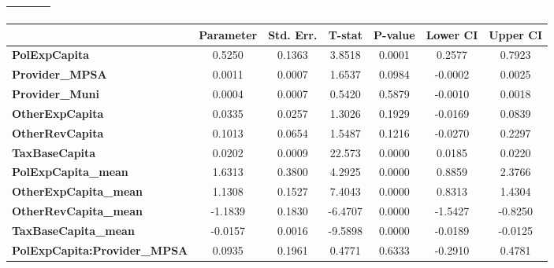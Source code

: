 \begin{center}
\begin{tabular}{lclc}
\textbf{}                                  &                    & \textbf{                     }   &                  \\
\bottomrule
\end{tabular}
\begin{tabular}{lcccccc}
                                           & \textbf{Parameter} & \textbf{Std. Err.} & \textbf{T-stat} & \textbf{P-value} & \textbf{Lower CI} & \textbf{Upper CI}  \\
\midrule
\textbf{PolExpCapita}                      &       0.5250       &       0.1363       &      3.8518     &      0.0001      &       0.2577      &       0.7923       \\
\textbf{Provider\_MPSA}                    &       0.0011       &       0.0007       &      1.6537     &      0.0984      &      -0.0002      &       0.0025       \\
\textbf{Provider\_Muni}                    &       0.0004       &       0.0007       &      0.5420     &      0.5879      &      -0.0010      &       0.0018       \\
\textbf{OtherExpCapita}                    &       0.0335       &       0.0257       &      1.3026     &      0.1929      &      -0.0169      &       0.0839       \\
\textbf{OtherRevCapita}                    &       0.1013       &       0.0654       &      1.5487     &      0.1216      &      -0.0270      &       0.2297       \\
\textbf{TaxBaseCapita}                     &       0.0202       &       0.0009       &      22.573     &      0.0000      &       0.0185      &       0.0220       \\
\textbf{PolExpCapita\_mean}                &       1.6313       &       0.3800       &      4.2925     &      0.0000      &       0.8859      &       2.3766       \\
\textbf{OtherExpCapita\_mean}              &       1.1308       &       0.1527       &      7.4043     &      0.0000      &       0.8313      &       1.4304       \\
\textbf{OtherRevCapita\_mean}              &      -1.1839       &       0.1830       &     -6.4707     &      0.0000      &      -1.5427      &      -0.8250       \\
\textbf{TaxBaseCapita\_mean}               &      -0.0157       &       0.0016       &     -9.5898     &      0.0000      &      -0.0189      &      -0.0125       \\
\textbf{PolExpCapita:Provider\_MPSA}       &       0.0935       &       0.1961       &      0.4771     &      0.6333      &      -0.2910      &       0.4781       \\

\end{tabular}
\end{center}
